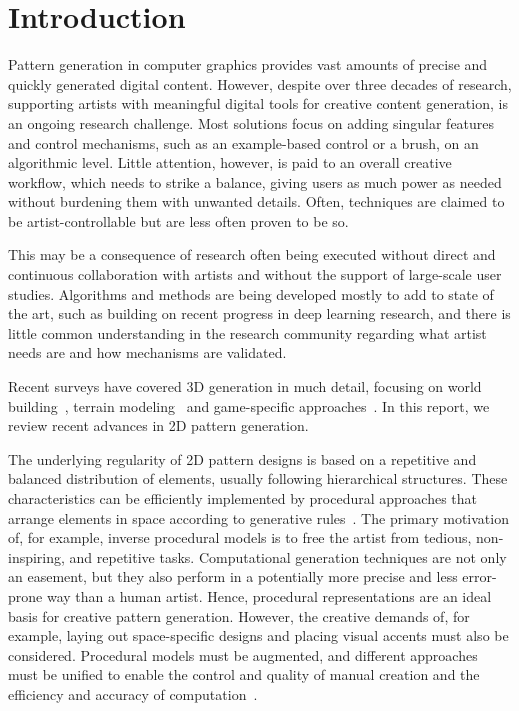 \section{Introduction}
Pattern generation in computer graphics provides vast amounts of precise and quickly generated digital content. However, despite over three decades of research, supporting artists with meaningful digital tools for creative content generation,  is an ongoing research challenge. Most solutions focus on adding singular features and control mechanisms, such as an example-based control or a brush, on an algorithmic level. Little attention, however, is paid to an overall creative workflow, which needs to strike a balance, giving users as much power as needed without burdening them with unwanted details. Often, techniques are claimed to be artist-controllable but are less often proven to be so.

This may be a consequence of research often being executed without direct and continuous collaboration with artists and without the support of large-scale user studies. Algorithms and methods are being developed mostly to add to state of the art, such as building on recent progress in deep learning research, and there is little common understanding in the research community regarding what artist needs are and how mechanisms are validated.

Recent surveys have covered 3D generation in much detail, focusing on  world building~\cite{smelik_2014_aso, aliaga_2016_ipm}, terrain modeling~\cite{galin_2019_aro} and game-specific approaches~\cite{hendrikx_2013_pcg, togelius_2011_sbp}. In this report, we review recent advances in 2D pattern generation. 

The underlying regularity of 2D pattern designs is based on a repetitive and balanced distribution of elements, usually following hierarchical structures. These characteristics can be efficiently implemented by procedural approaches that arrange elements in space according to generative rules~\cite{stava_2010_ipm}. The primary motivation of, for example, inverse procedural models is to free the artist from tedious, non-inspiring, and repetitive tasks. Computational generation techniques are not only an easement, but they also perform in a potentially more precise and less error-prone way than a human artist. Hence, procedural representations are an ideal basis for creative pattern generation. However, the creative demands of, for example, laying out space-specific designs and placing visual accents must also be considered. Procedural models must be augmented, and different approaches must be unified to enable the control and quality of manual creation and the efficiency and accuracy of computation~\cite{gieseke_2017_ooo}. 

